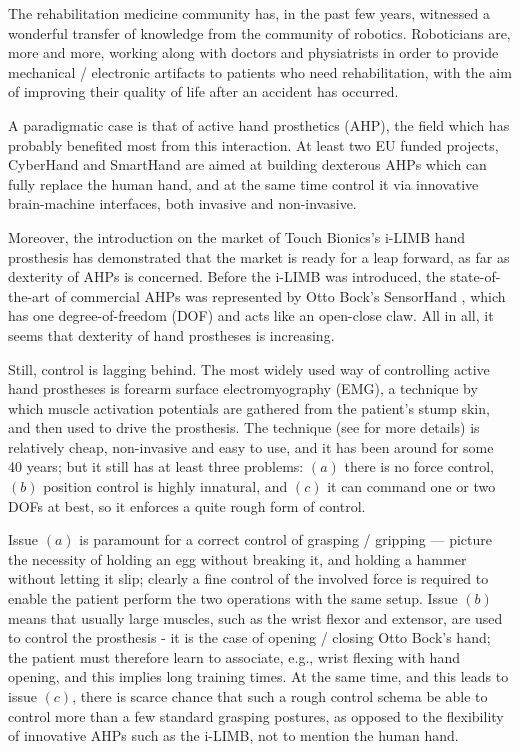 The rehabilitation medicine community has, in the past few years,
witnessed a wonderful transfer of knowledge from the community of
robotics. Roboticians are, more and more, working along with doctors
and physiatrists in order to provide mechanical / electronic artifacts
to patients who need rehabilitation, with the aim of improving their
quality of life after an accident has occurred.

A paradigmatic case is that of active hand prosthetics (AHP), the
field which has probably benefited most from this interaction. At
least two EU funded projects, CyberHand \cite{cyberhand} and SmartHand
\cite{smarthand} are aimed at building dexterous AHPs which can fully
replace the human hand, and at the same time control it via innovative
brain-machine interfaces, both invasive and non-invasive.

Moreover, the introduction on the market of Touch Bionics's i-LIMB
hand prosthesis \cite{ilimb} has demonstrated that the market is ready
for a leap forward, as far as dexterity of AHPs is concerned. Before
the i-LIMB was introduced, the state-of-the-art of commercial AHPs was
represented by Otto Bock's SensorHand \cite{sensorhand}, which has one
degree-of-freedom (DOF) and acts like an open-close claw. All in all,
it seems that dexterity of hand prostheses is increasing.

Still, control is lagging behind. The most widely used way of
controlling active hand prostheses is forearm surface electromyography
(EMG), a technique by which muscle activation potentials are gathered
from the patient's stump skin, and then used to drive the
prosthesis. The technique (see \cite{deluca} for more details) is
relatively cheap, non-invasive and easy to use, and it has been around
for some 40 years; but it still has at least three problems: $(a)$
there is no force control, $(b)$ position control is highly innatural,
and $(c)$ it can command one or two DOFs at best, so it enforces a
quite rough form of control.

Issue $(a)$ is paramount for a correct control of grasping / gripping
--- picture the necessity of holding an egg without breaking it, and
holding a hammer without letting it slip; clearly a fine control of
the involved force is required to enable the patient perform the two
operations with the same setup. Issue $(b)$ means that usually large
muscles, such as the wrist flexor and extensor, are used to control
the prosthesis - it is the case of opening / closing Otto Bock's hand;
the patient must therefore learn to associate, e.g., wrist flexing
with hand opening, and this implies long training times. At the same
time, and this leads to issue $(c)$, there is scarce chance that such
a rough control schema be able to control more than a few standard
grasping postures, as opposed to the flexibility of innovative AHPs
such as the i-LIMB, not to mention the human hand.

